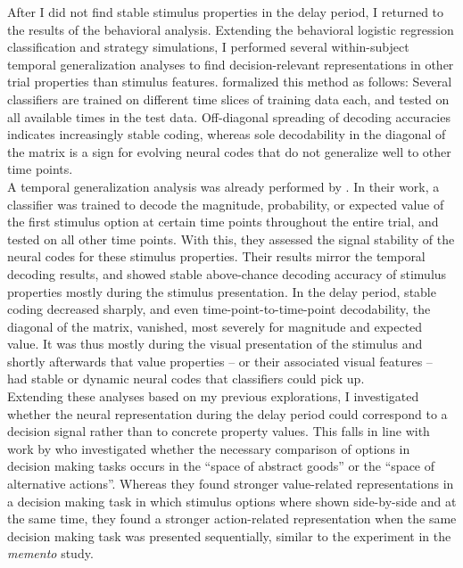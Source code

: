 After I did not find stable stimulus properties in the delay period, I returned to the results of the behavioral analysis. Extending the behavioral logistic regression classification and strategy simulations, I performed several within-subject temporal generalization analyses to find decision-relevant representations in other trial properties than stimulus features.
\citet{king2014characterizing} formalized this method as follows:
Several classifiers are trained on different time slices of training data each, and tested on all available times in the test data.
Off-diagonal spreading of decoding accuracies indicates increasingly stable coding, whereas sole decodability in the diagonal of the matrix is a sign for evolving neural codes that do not generalize well to other time points.\\
A temporal generalization analysis was already performed by \citet{kaiserposter}.
In their work, a classifier was trained to decode the magnitude, probability, or expected value of the first stimulus option at certain time points throughout the entire trial, and tested on all other time points.
With this, they assessed the signal stability of the neural codes for these stimulus properties.
Their results mirror the temporal decoding results, and showed stable above-chance decoding accuracy of stimulus properties mostly during the stimulus presentation.
In the delay period, stable coding decreased sharply, and even time-point-to-time-point decodability, the diagonal of the matrix, vanished, most severely for magnitude and expected value.
It was thus mostly during the visual presentation of the stimulus and shortly afterwards that value properties -- or their associated visual features -- had stable or dynamic neural codes that classifiers could pick up.\\
Extending these analyses based on my previous explorations, I investigated whether the neural representation during the delay period could correspond to a decision signal rather than to concrete property values.
This falls in line with work by \citet{hunt2013trial} who investigated whether the necessary comparison of options in decision making tasks occurs in the ``space of abstract goods'' or the ``space of alternative actions''.
Whereas they found stronger value-related representations in a decision making task in which stimulus options where shown side-by-side and at the same time, they found a stronger action-related representation when the same decision making task was presented sequentially, similar to the experiment in the \textit{memento} study.
